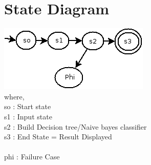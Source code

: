 \documentclass[12pt]{article}
\begin{document}
\section{State Diagram }
\includegraphics[scale=0.9]{state.png}\\
where,\\
so : Start state\\
s1 : Input state\\
s2 : Build Decision tree/Naive bayes classifier\\
s3 : End State = Result Displayed\\\\
phi : Failure Case\\
\end{document}
